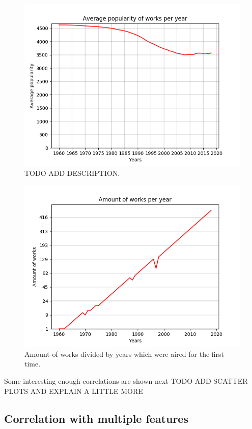 \begin{figure}[!hbt]
\begin{center}
	\includegraphics[width=\columnwidth]{graphics/avgWorksPopularityPerYear_1960-2018.png}
	\caption{TODO ADD DESCRIPTION.}
	\label{fig:avgCaracteristicsOfWorks}
	\end{center}
\end{figure}

\begin{figure}[!hbt]
	\begin{center}
	\includegraphics[width=\columnwidth]{graphics/worksPerYear_1960-2018.png}
	\caption{Amount of works divided by years which were aired for the first time.}
	\label{fig:amountOfWorksPerYear}
	\end{center}
\end{figure}

Some interesting enough correlations are shown next
TODO ADD SCATTER PLOTS AND EXPLAIN A LITTLE MORE

\subsection{Correlation with multiple features}


